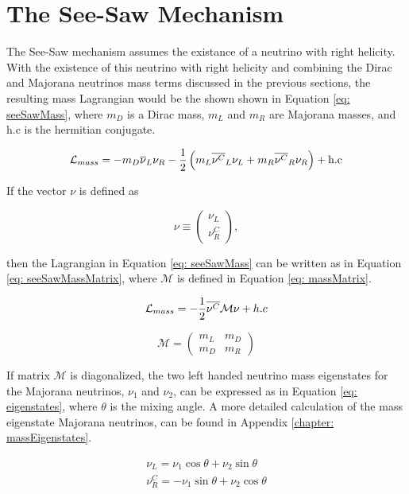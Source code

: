 \section{The See-Saw Mechanism}
 

The See-Saw mechanism assumes the existance of a neutrino with right helicity. With the existence of this neutrino with right helicity and combining the Dirac and Majorana neutrinos mass terms discussed in the previous sections, the resulting mass Lagrangian would be the shown shown in Equation \ref{eq: seeSawMass}, where $m_{D}$ is a Dirac mass, $m_{L}$ and $m_{R}$ are Majorana masses, and h.c is the hermitian conjugate.

\begin{equation}\label{eq: seeSawMass}
\mathcal{L}_{mass} = -m_{D}\overline{\nu}_{L}\nu_{R} - \frac{1}{2}\left(m_{L}\overline{\nu^{C}}_{L}\nu_{L} + m_{R}\overline{\nu^{C}}_{R}\nu_{R}\right) + \text{h.c}
\end{equation}

If the vector $\nu$ is defined as

$$ \nu \equiv \begin{pmatrix} \nu_{L}\\ \nu^{C}_{R} \end{pmatrix} ,$$

then the Lagrangian in Equation \ref{eq: seeSawMass} can be written as in Equation \ref{eq: seeSawMassMatrix}, where $\mathcal{M}$ is defined in Equation \ref{eq: massMatrix}.

\begin{equation}\label{eq: seeSawMassMatrix}
\mathcal{L}_{mass} = -\frac{1}{2}\overline{\nu^{C}}\mathcal{M}\nu + h.c
\end{equation}

\begin{equation}\label{eq: massMatrix}
\mathcal{M} = \begin{pmatrix} m_{L}&m_{D}\\m_{D}&m_{R} \end{pmatrix}
\end{equation}

If matrix $\mathcal{M}$ is diagonalized, the two left handed neutrino mass eigenstates for the Majorana neutrinos, $\nu_{1}$ and $\nu_{2}$, can be expressed as in Equation \ref{eq: eigenstates}, where $\theta$ is the mixing angle. A more detailed calculation of the mass eigenstate Majorana neutrinos, can be found in Appendix \ref{chapter: massEigenstates}.

\begin{equation*}
\begin{split}
\nu_{L} = \nu_{1} \cos \theta + \nu_{2} \sin \theta \\
\nu_{R}^{C} = -\nu_{1} \sin \theta + \nu_{2} \cos \theta
\end{split}
\end{equation*}


